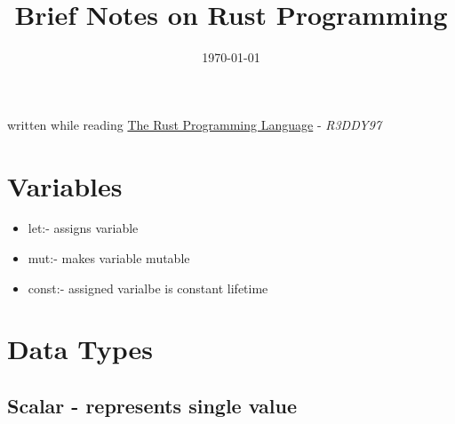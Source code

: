 \documentclass[11pt]{article}
\date{\today}
\title{Brief Notes on Rust Programming}
\begin{document}
\maketitle
\setcounter{tocdepth}{1}
\tableofcontents

written while reading  \href{https://doc.rust-lang.org/book/second-edition/index.html}{The Rust Programming Language}  - \emph{R3DDY97}


\section{Variables}
\label{sec-1}

\begin{itemize}
\item let:- assigns variable

\item mut:- makes variable mutable

\item const:- assigned varialbe is constant lifetime
\end{itemize}



\section{Data Types}
\label{sec-2}

\subsection{Scalar  - represents single value}
\label{sec-2-1}
\end{document}
